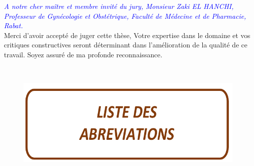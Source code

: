 \noindent\emph{\textcolor{blue}{A notre cher maître et membre invité du jury, Monsieur Zaki EL HANCHI, Professeur de Gynécologie et Obstétrique, Faculté de Médecine et de Pharmacie, Rabat.}} \\  
Merci d'avoir accepté de juger cette thèse,  Votre expertise dans le domaine et vos critiques constructives seront déterminant dans l'amélioration de la qualité de ce travail. Soyez assuré de ma profonde reconnaissance. \vspace*{1em}     

\pagebreak

\begin{itemize}
  \item[\textcolor{white}{$\Box$}] 
\end{itemize}


\vspace{7cm}

\begin{figure}[H]
  \includegraphics{Images/list_abrv.png}
\end{figure}

\pagebreak


